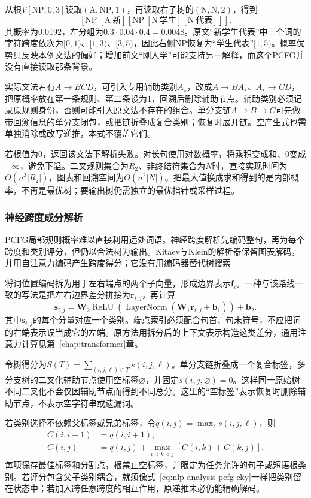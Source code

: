 从根$V[\mathrm{NP},0,3]$读取$(\mathrm A,\mathrm{NP},1)$，再读取右子树的$(\mathrm N,\mathrm N,2)$，得到
\[
 [\mathrm{NP}\ [\mathrm A\ \text{新}]
       [\mathrm{NP}\ [\mathrm N\ \text{学生}]
                    [\mathrm N\ \text{代表}]]].
\]
其概率为0.0192，左分组为$0.3\cdot0.04\cdot0.4=0.0048$。原文“新学生代表”中三个词的字符跨度依次为$[0,1)$、$[1,3)$、$[3,5)$，因此右侧NP恢复为“学生代表”$[1,5)$。概率优势只反映本例文法的偏好；增加前文“刚入学”可能支持另一解释，而这个PCFG并没有直接读取那条背景。

实际文法若有$A\to BCD$，可引入专用辅助类别$A_\star$，改成$A\to B A_\star$、$A_\star\to CD$，把原概率放在第一条规则、第二条设为1，回溯后删除辅助节点。辅助类别必须记录原规则身份，否则可能引入原文法不存在的组合。单分支链$A\to B\to C$可先做带回溯信息的单分支闭包，或把链折叠成复合类别；恢复时展开链。空产生式也需单独消除或改写递推，本式不覆盖它们。

若根值为0，返回该文法下解析失败。对长句使用对数概率，将乘积变成和、0变成$-\infty$，避免下溢。二叉规则集合为$R_2$、非终结符集合为$N$时，直接实现时间为$O(n^3|R_2|)$，图表和回溯空间为$O(n^2|N|)$。把最大值换成求和得到的是内部概率，不再是最优树；要输出树仍需独立的最优指针或采样过程。

\subsubsection{神经跨度成分解析}
\label{sec:nlp-analysis-neural-cky}

PCFG局部规则概率难以直接利用远处词语。神经跨度解析先编码整句，再为每个跨度和类别评分，但仍以合法树为输出。Kitaev与Klein的解析器保留图表解码，并用自注意力编码产生跨度得分；它没有用编码器替代树搜索

将词位置编码拆为用于左右端点的两个子向量，形成边界表示$\bm f_i$。一种与该路线一致的写法是把左右边界差分拼接为$\bm r_{i,j}$，再计算
\[
 \bm s_{i,j}=\bm W_2
  \operatorname{ReLU}\!\left(
   \operatorname{LayerNorm}(\bm W_1\bm r_{i,j}+\bm b_1)
  \right)+\bm b_2.
\]
其中$\bm s_{i,j}$的每个分量对应一个类别。端点索引必须配合句首、句末符号，不应把词的右端表示误当成它的左端。原方法用拆分后的上下文表示构造这类差分，通用注意力计算见第~\ref{chap:transformer}章。

令树得分为$S(T)=\sum_{(i,j,\ell)\in T}s(i,j,\ell)$。单分支链折叠成一个复合标签，多分支树的二叉化辅助节点使用空标签$\varnothing$，并固定$s(i,j,\varnothing)=0$。这样同一原始树不同二叉化不会仅因辅助节点而得到不同总分。这里的“空标签”表示恢复时删除辅助节点，不表示空字符串或遗漏词。

若类别选择不依赖父标签或兄弟标签，令$q(i,j)=\max_{\ell}s(i,j,\ell)$，则
\begin{align}
 C(i,i+1)&=q(i,i+1),\nonumber\\
 C(i,j)&=q(i,j)+\max_{i<k<j}[C(i,k)+C(k,j)].
 \label{eq:nlp-analysis-neural-cky}
\end{align}
每项保存最佳标签和分割点，根禁止空标签，并限定为任务允许的句子或短语根类别。若评分包含父子类别耦合，就须像式~\eqref{eq:nlp-analysis-pcfg-cky}一样把类别留在状态中；若加入跨任意跨度的相互作用，原递推未必仍能精确解码。

